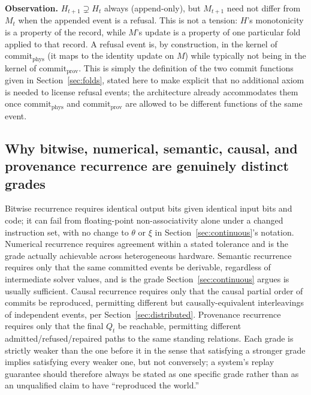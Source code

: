 \documentclass[11pt]{article}
\begin{document}
\textbf{Observation.} $H_{t+1} \supsetneq H_t$ always (append-only), but $M_{t+1}$ need not differ from $M_t$ when the appended event is a refusal. This is not a tension: $H$'s monotonicity is a property of the record, while $M$'s update is a property of one particular fold applied to that record. A refusal event is, by construction, in the kernel of $\mathrm{commit}_{\mathrm{phys}}$ (it maps to the identity update on $M$) while typically not being in the kernel of $\mathrm{commit}_{\mathrm{prov}}$. This is simply the definition of the two commit functions given in Section~\ref{sec:folds}, stated here to make explicit that no additional axiom is needed to license refusal events; the architecture already accommodates them once $\mathrm{commit}_{\mathrm{phys}}$ and $\mathrm{commit}_{\mathrm{prov}}$ are allowed to be different functions of the same event.

\subsection{Why bitwise, numerical, semantic, causal, and provenance recurrence are genuinely distinct grades}

Bitwise recurrence requires identical output bits given identical input bits and code; it can fail from floating-point non-associativity alone under a changed instruction set, with no change to $\theta$ or $\xi$ in Section~\ref{sec:continuous}'s notation. Numerical recurrence requires agreement within a stated tolerance and is the grade actually achievable across heterogeneous hardware. Semantic recurrence requires only that the same committed events be derivable, regardless of intermediate solver values, and is the grade Section~\ref{sec:continuous} argues is usually sufficient. Causal recurrence requires only that the causal partial order of commits be reproduced, permitting different but causally-equivalent interleavings of independent events, per Section~\ref{sec:distributed}. Provenance recurrence requires only that the final $Q_t$ be reachable, permitting different admitted/refused/repaired paths to the same standing relations. Each grade is strictly weaker than the one before it in the sense that satisfying a stronger grade implies satisfying every weaker one, but not conversely; a system's replay guarantee should therefore always be stated as one specific grade rather than as an unqualified claim to have ``reproduced the world.''
\end{document}
